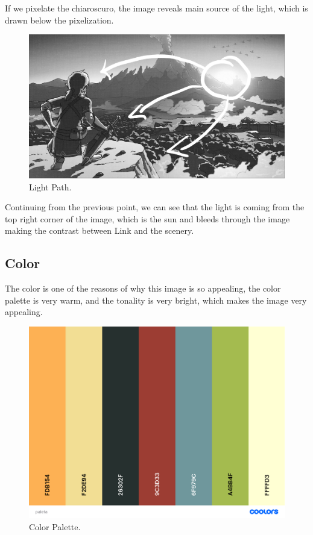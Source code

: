 \documentclass{cup-pan}
\begin{document}
            If we pixelate the chiaroscuro, the image reveals main source of the light, which is drawn below the pixelization. 
            \begin{figure}[H]
                \includegraphics[width=\textwidth]{Imagenes/Referencias/Analisis_ConceptArt/recorrido luz.png}
                \caption{Light Path.}
            \end{figure}

            Continuing from the previous point, we can see that the light is coming from the top right corner of the image, which is the sun and bleeds through the image making the contrast between Link and the scenery.\\
        \newpage
        \subsection{Color}

            The color is one of the reasons of why this image is so appealing, the color palette is very warm, and the tonality is very bright, which makes the image very appealing.\\
             \begin{figure}[H]
                \includegraphics[width=\textwidth]{Imagenes/Referencias/Analisis_ConceptArt/paleta.png}
                \caption{Color Palette.}
            \end{figure}
\end{document}
